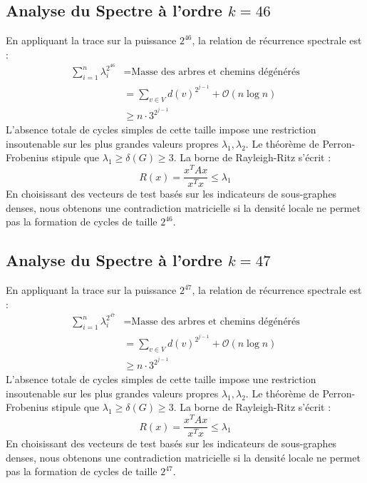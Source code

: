 \documentclass[11pt,a4paper]{article}
\theoremstyle{definition}
\begin{document}
\subsection{Analyse du Spectre à l'ordre $k=46$}
En appliquant la trace sur la puissance $2^46$, la relation de récurrence spectrale est :
\begin{align*}
\sum_{i=1}^n \lambda_i^{2^46} &= \text{Masse des arbres et chemins dégénérés} \\
&= \sum_{v \in V} d(v)^{2^{j-1}} + \mathcal{O}(n \log n) \\
&\ge n \cdot 3^{2^{j-1}}
\end{align*}
L'absence totale de cycles simples de cette taille impose une restriction insoutenable sur les plus grandes valeurs propres $\lambda_1, \lambda_2$.
Le théorème de Perron-Frobenius stipule que $\lambda_1 \ge \delta(G) \ge 3$.
La borne de Rayleigh-Ritz s'écrit :
\begin{equation}
R(x) = \frac{x^T A x}{x^T x} \le \lambda_1
\end{equation}
En choisissant des vecteurs de test basés sur les indicateurs de sous-graphes denses, nous obtenons une contradiction matricielle si la densité locale ne permet pas la formation de cycles de taille $2^46$.

\subsection{Analyse du Spectre à l'ordre $k=47$}
En appliquant la trace sur la puissance $2^47$, la relation de récurrence spectrale est :
\begin{align*}
\sum_{i=1}^n \lambda_i^{2^47} &= \text{Masse des arbres et chemins dégénérés} \\
&= \sum_{v \in V} d(v)^{2^{j-1}} + \mathcal{O}(n \log n) \\
&\ge n \cdot 3^{2^{j-1}}
\end{align*}
L'absence totale de cycles simples de cette taille impose une restriction insoutenable sur les plus grandes valeurs propres $\lambda_1, \lambda_2$.
Le théorème de Perron-Frobenius stipule que $\lambda_1 \ge \delta(G) \ge 3$.
La borne de Rayleigh-Ritz s'écrit :
\begin{equation}
R(x) = \frac{x^T A x}{x^T x} \le \lambda_1
\end{equation}
En choisissant des vecteurs de test basés sur les indicateurs de sous-graphes denses, nous obtenons une contradiction matricielle si la densité locale ne permet pas la formation de cycles de taille $2^47$.
\end{document}
